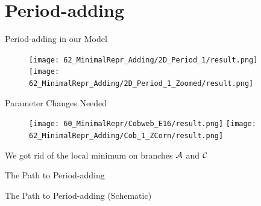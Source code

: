 \section{Period-adding}

\begin{frame}{Period-adding in our Model}
	\begin{figure}
		\texttt{[image: 62\_MinimalRepr\_Adding/2D\_Period\_1/result.png]}
		\quad
		\texttt{[image: 62\_MinimalRepr\_Adding/2D\_Period\_1\_Zoomed/result.png]}
	\end{figure}
\end{frame}

\begin{frame}{Parameter Changes Needed}
	\vspace{-1em}
	\begin{figure}
		\texttt{[image: 60\_MinimalRepr/Cobweb\_E16/result.png]}
		\texttt{[image: 62\_MinimalRepr\_Adding/Cob\_1\_ZCorn/result.png]}
	\end{figure}
	We got rid of the local minimum on branches $\mathcal{A}$ and $\mathcal{C}$
\end{frame}

\begin{frame}{The Path to Period-adding}

\end{frame}

\begin{frame}{The Path to Period-adding (Schematic)}
	\begin{figure}
	\end{figure}
\end{frame}

